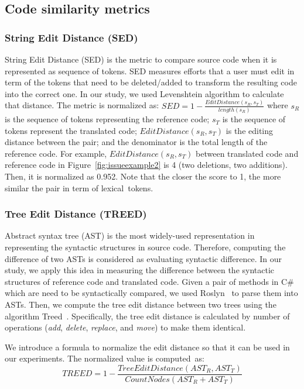 \subsection{Code similarity metrics}

\subsubsection{\textbf{String Edit Distance (SED)}}
String Edit Distance (SED) is the metric to compare source code when
it is represented as sequence of tokens. SED measures efforts that a
user must edit in term of the tokens that need to be deleted/added to
transform the resulting code into the correct one. In our study, we
used Levenshtein algorithm to calculate that distance. The metric is
normalized as: $SED = 1 - \frac{EditDistance\left(s_R,
  s_T\right)}{length\left(s_R\right)}$ where $s_R$ is the sequence of
tokens representing the reference code; $s_T$ is the sequence of
tokens represent the translated code; $EditDistance\left(s_R,
s_T\right)$ is the editing distance between the pair; and the
denominator is the total length of the reference code. For example,
$EditDistance\left(s_R, s_T\right)$ between translated code and
reference code in Figure~\ref{fig:issueexample2} is 4 (two deletions,
two additions). Then, it is normalized as 0.952. Note that the closer
the score to 1, the more similar the pair in term of lexical~tokens.

\subsubsection{\textbf{Tree Edit Distance (TREED)}}  

Abstract syntax tree (AST) is the most widely-used representation in
representing the syntactic structures in source code. Therefore,
computing the difference of two ASTs is considered as evaluating
syntactic difference.  In our study, we apply this idea in measuring
the difference between the syntactic structures of reference code and
translated code. Given a pair of methods in C\# which are need to be
syntactically compared, we used Roslyn~\cite{roslyn} to parse them into
ASTs. Then, we compute the tree edit distance between two trees using
the algorithm Treed~\cite{oopsla10}. Specifically, the tree edit
distance is calculated by number of operations ({\em add}, {\em
delete}, {\em replace}, and {\em move}) to make them identical.

We introduce a formula to normalize the edit distance so that it can
be used in our experiments. The normalized value is computed~as:
\[TREED = 1 -  \frac{TreeEditDistance\left(AST_R, AST_T\right)}{CountNodes \left(AST_R+AST_T\right)}\] 
  
